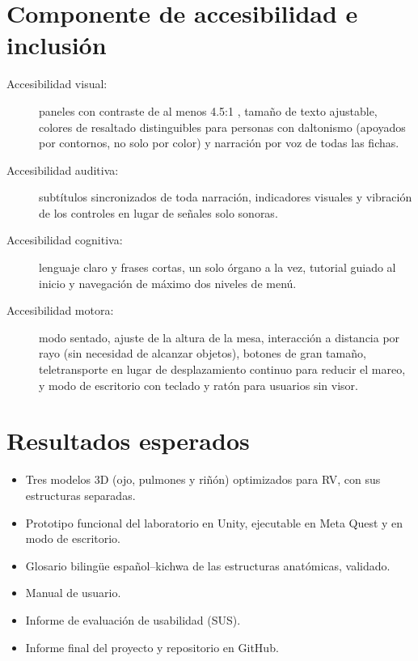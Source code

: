\documentclass[11pt,a4paper]{article}
\begin{document}
\section{Componente de accesibilidad e inclusión}
\begin{description}
    \item[Accesibilidad visual:] paneles con contraste de al menos 4.5:1 \cite{wcag22}, tamaño de texto ajustable, colores de resaltado distinguibles para personas con daltonismo (apoyados por contornos, no solo por color) y narración por voz de todas las fichas.
    \item[Accesibilidad auditiva:] subtítulos sincronizados de toda narración, indicadores visuales y vibración de los controles en lugar de señales solo sonoras.
    \item[Accesibilidad cognitiva:] lenguaje claro y frases cortas, un solo órgano a la vez, tutorial guiado al inicio y navegación de máximo dos niveles de menú.
    \item[Accesibilidad motora:] modo sentado, ajuste de la altura de la mesa, interacción a distancia por rayo (sin necesidad de alcanzar objetos), botones de gran tamaño, teletransporte en lugar de desplazamiento continuo para reducir el mareo, y modo de escritorio con teclado y ratón para usuarios sin visor.
\end{description}

\section{Resultados esperados}
\begin{itemize}
    \item Tres modelos 3D (ojo, pulmones y riñón) optimizados para RV, con sus estructuras separadas.
    \item Prototipo funcional del laboratorio en Unity, ejecutable en Meta Quest y en modo de escritorio.
    \item Glosario bilingüe español--kichwa de las estructuras anatómicas, validado.
    \item Manual de usuario.
    \item Informe de evaluación de usabilidad (SUS).
    \item Informe final del proyecto y repositorio en GitHub.
\end{itemize}
\end{document}
